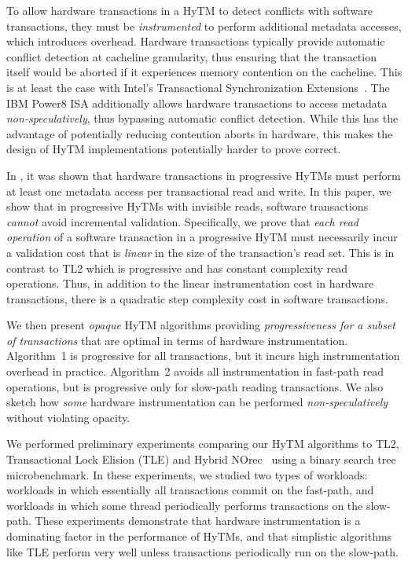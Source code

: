 To allow hardware transactions in a HyTM to detect conflicts with software transactions, they must be \emph{instrumented} to perform additional metadata accesses, which introduces overhead.
Hardware transactions typically provide automatic conflict detection at cacheline granularity,
thus ensuring that the transaction itself would be aborted if it experiences memory contention on the cacheline.
This is at least the case with Intel's Transactional Synchronization Extensions~\cite{haswell}.
The IBM Power8 ISA additionally allows hardware transactions to access metadata \emph{non-speculatively}, 
thus bypassing automatic conflict detection. While this has the advantage of potentially reducing contention aborts
in hardware, this makes the design of HyTM implementations potentially harder to prove correct.

In \cite{htmdisc15}, it was shown that hardware transactions in progressive HyTMs must perform
at least one metadata access per transactional read and write.
In this paper, we show that in progressive HyTMs with invisible reads, 
software transactions \textit{cannot} avoid incremental validation.
Specifically, we prove that \textit{each read operation} of a software transaction in a progressive HyTM
must necessarily incur a validation cost that is \emph{linear} 
in the size of the transaction's read set. 
This is in contrast to TL2 which is progressive and has constant complexity read operations.
Thus, in addition to the linear instrumentation cost in hardware transactions, there is a quadratic step complexity cost in software transactions.

We then present \emph{opaque} HyTM algorithms providing \emph{progressiveness for a subset of transactions} that are  %
optimal in terms of hardware instrumentation.
Algorithm~1 is progressive for all transactions, but it incurs high instrumentation overhead in practice.
Algorithm~2 avoids all instrumentation in fast-path read operations, but is progressive only for slow-path reading transactions.
We also sketch how \emph{some} hardware instrumentation can be performed \textit{non-speculatively} without violating opacity.

We performed preliminary experiments comparing our HyTM algorithms to TL2, Transactional Lock Elision (TLE) and Hybrid NOrec~\cite{hynorecriegel} using a binary search tree microbenchmark.
In these experiments, we studied two types of workloads: workloads in which essentially all transactions commit on the fast-path, and workloads in which some thread periodically performs transactions on the slow-path.
These experiments demonstrate that hardware instrumentation is a dominating factor in the performance of HyTMs, and that simplistic algorithms like TLE perform very well unless transactions periodically run on the slow-path.


